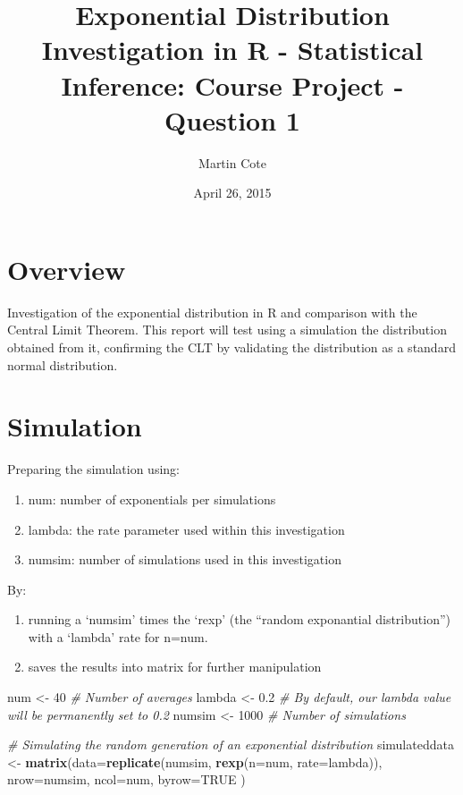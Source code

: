 \documentclass[]{article}
\title{Exponential Distribution Investigation in R - Statistical Inference:
Course Project - Question 1}
\author{Martin Cote}
\date{April 26, 2015}
\newenvironment{Shaded}{\begin{snugshade}}{\end{snugshade}}
\newcommand{\KeywordTok}[1]{\textcolor[rgb]{0.13,0.29,0.53}{\textbf{{#1}}}}
\newcommand{\DataTypeTok}[1]{\textcolor[rgb]{0.13,0.29,0.53}{{#1}}}
\newcommand{\DecValTok}[1]{\textcolor[rgb]{0.00,0.00,0.81}{{#1}}}
\newcommand{\FloatTok}[1]{\textcolor[rgb]{0.00,0.00,0.81}{{#1}}}
\newcommand{\StringTok}[1]{\textcolor[rgb]{0.31,0.60,0.02}{{#1}}}
\newcommand{\CommentTok}[1]{\textcolor[rgb]{0.56,0.35,0.01}{\textit{{#1}}}}
\newcommand{\OtherTok}[1]{\textcolor[rgb]{0.56,0.35,0.01}{{#1}}}
\newcommand{\NormalTok}[1]{{#1}}
\begin{document}
\maketitle


\section{Overview}\label{overview}

Investigation of the exponential distribution in R and comparison with
the Central Limit Theorem. This report will test using a simulation the
distribution obtained from it, confirming the CLT by validating the
distribution as a standard normal distribution.

\section{Simulation}\label{simulation}

Preparing the simulation using:

\begin{enumerate}
\def\labelenumi{\arabic{enumi}.}
\itemsep1pt\parskip0pt
\item
  num: number of exponentials per simulations
\item
  lambda: the rate parameter used within this investigation
\item
  numsim: number of simulations used in this investigation
\end{enumerate}

By:

\begin{enumerate}
\def\labelenumi{\arabic{enumi}.}
\itemsep1pt\parskip0pt
\item
  running a `numsim' times the `rexp' (the ``random exponantial
  distribution'') with a `lambda' rate for n=num.
\item
  saves the results into matrix for further manipulation
\end{enumerate}

\begin{Shaded}
\begin{Highlighting}[]
\NormalTok{num <-}\StringTok{ }\DecValTok{40} \CommentTok{# Number of averages}
\NormalTok{lambda <-}\StringTok{ }\FloatTok{0.2} \CommentTok{# By default, our lambda value will be permanently set to 0.2}
\NormalTok{numsim <-}\StringTok{ }\DecValTok{1000} \CommentTok{# Number of simulations}

\CommentTok{# Simulating the random generation of an exponential distribution}
\NormalTok{simulateddata <-}\StringTok{ }\KeywordTok{matrix}\NormalTok{(}\DataTypeTok{data=}\KeywordTok{replicate}\NormalTok{(numsim, }\KeywordTok{rexp}\NormalTok{(}\DataTypeTok{n=}\NormalTok{num, }\DataTypeTok{rate=}\NormalTok{lambda)),}
                        \DataTypeTok{nrow=}\NormalTok{numsim,}
                        \DataTypeTok{ncol=}\NormalTok{num,}
                        \DataTypeTok{byrow=}\OtherTok{TRUE} \NormalTok{)}
\end{Highlighting}
\end{Shaded}
\end{document}
